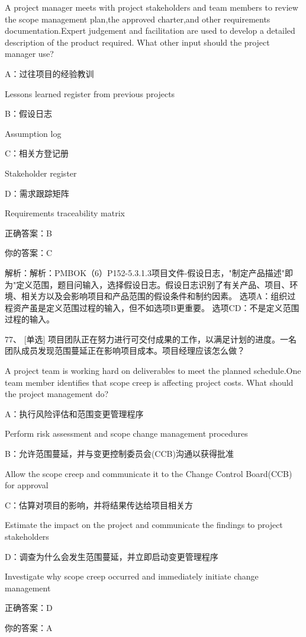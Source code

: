 A project manager meets with project stakeholders and team members to review the scope management plan,the approved charter,and other requirements documentation.Expert judgement and facilitation are used to develop a detailed description of the product required. What other input should the project manager use?

A：过往项目的经验教训

Lessons learned register from previous projects

B：假设日志

Assumption log

C：相关方登记册

Stakeholder register

D：需求跟踪矩阵

Requirements traceability matrix

正确答案：B

你的答案：C

解析：解析：PMBOK（6）P152-5.3.1.3项目文件-假设日志，"制定产品描述"即为"定义范围，题目问输入，选择假设日志。假设日志识别了有关产品、项目、环境、相关方以及会影响项目和产品范围的假设条件和制约因素。 选项A：组织过程资产虽是定义范围过程的输入，但不如选项B更重要。 选项CD：不是定义范围过程的输入。


77、 [单选] 项目团队正在努力进行可交付成果的工作，以满足计划的进度。一名团队成员发现范围蔓延正在影响项目成本。项目经理应该怎么做？

A project team is working hard on deliverables to meet the planned schedule.One team member identifies that scope creep is affecting project costs. What should the project management do?

A：执行风险评估和范围变更管理程序

Perform risk assessment and scope change management procedures

B：允许范围蔓延，并与变更控制委员会(CCB)沟通以获得批准

Allow the scope creep and communicate it to the Change Control Board(CCB) for approval

C：估算对项目的影响，并将结果传达给项目相关方

Estimate the impact on the project and communicate the findings to project stakeholders

D：调查为什么会发生范围蔓延，并立即启动变更管理程序

Investigate why scope creep occurred and immediately initiate change management

正确答案：D

你的答案：A

